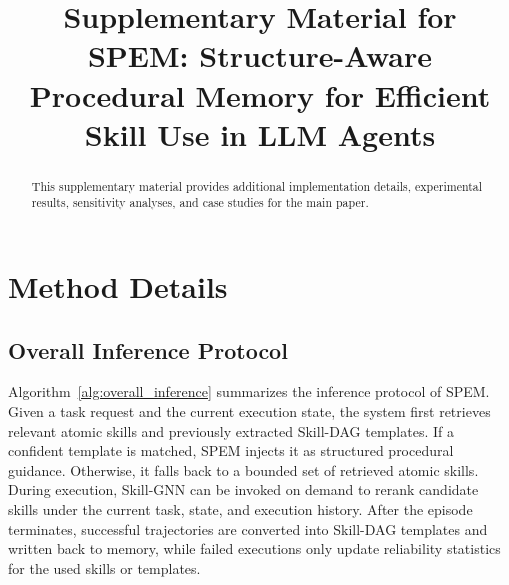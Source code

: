 \documentclass[letterpaper]{article}
\title{Supplementary Material for SPEM: Structure-Aware Procedural Memory for Efficient Skill Use in LLM Agents}
\newcommand{\model}{\textsc{SPEM}}
\begin{document}
\maketitle
\appendix
\setcounter{section}{0}
\setcounter{subsection}{0}
\setcounter{subsubsection}{0}

\renewcommand{\thesection}{\Alph{section}}
\renewcommand{\thesubsection}{\Alph{section}.\arabic{subsection}}
\renewcommand{\thesubsubsection}{\Alph{section}.\arabic{subsection}.\arabic{subsubsection}}


\begin{abstract}
This supplementary material provides additional implementation details,
experimental results, sensitivity analyses, and case studies for the main paper.
\end{abstract}

\section{Method Details}
\subsection{Overall Inference Protocol}
\label{app:overall_inference}

Algorithm~\ref{alg:overall_inference} summarizes the inference protocol of
\model{}. Given a task request and the current execution state, the system first
retrieves relevant atomic skills and previously extracted Skill-DAG templates.
If a confident template is matched, \model{} injects it as structured procedural
guidance. Otherwise, it falls back to a bounded set of retrieved atomic skills.
During execution, Skill-GNN can be invoked on demand to rerank candidate skills
under the current task, state, and execution history. After the episode
terminates, successful trajectories are converted into Skill-DAG templates and
written back to memory, while failed executions only update reliability
statistics for the used skills or templates.
\end{document}
